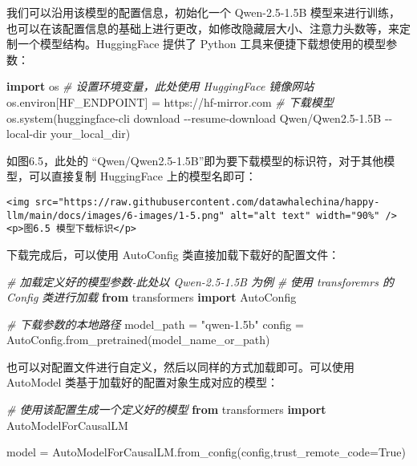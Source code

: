 \documentclass[
]{article}
\newenvironment{Shaded}{}{}
\newcommand{\CommentTok}[1]{\textcolor[rgb]{0.38,0.63,0.69}{\textit{#1}}}
\newcommand{\ImportTok}[1]{\textcolor[rgb]{0.00,0.50,0.00}{\textbf{#1}}}
\newcommand{\NormalTok}[1]{#1}
\newcommand{\OperatorTok}[1]{\textcolor[rgb]{0.40,0.40,0.40}{#1}}
\newcommand{\StringTok}[1]{\textcolor[rgb]{0.25,0.44,0.63}{#1}}
\newcommand{\VariableTok}[1]{\textcolor[rgb]{0.10,0.09,0.49}{#1}}
\begin{document}
我们可以沿用该模型的配置信息，初始化一个 Qwen-2.5-1.5B
模型来进行训练，也可以在该配置信息的基础上进行更改，如修改隐藏层大小、注意力头数等，来定制一个模型结构。HuggingFace
提供了 Python 工具来便捷下载想使用的模型参数：

\begin{Shaded}
\begin{Highlighting}[]
\ImportTok{import}\NormalTok{ os}
\CommentTok{\# 设置环境变量，此处使用 HuggingFace 镜像网站}
\NormalTok{os.environ[}\StringTok{\textquotesingle{}HF\_ENDPOINT\textquotesingle{}}\NormalTok{] }\OperatorTok{=} \StringTok{\textquotesingle{}https://hf{-}mirror.com\textquotesingle{}}
\CommentTok{\# 下载模型}
\NormalTok{os.system(}\StringTok{\textquotesingle{}huggingface{-}cli download {-}{-}resume{-}download Qwen/Qwen2.5{-}1.5B {-}{-}local{-}dir your\_local\_dir\textquotesingle{}}\NormalTok{)}
\end{Highlighting}
\end{Shaded}

如图6.5，此处的
``Qwen/Qwen2.5-1.5B''即为要下载模型的标识符，对于其他模型，可以直接复制
HuggingFace 上的模型名即可：

\begin{verbatim}
<img src="https://raw.githubusercontent.com/datawhalechina/happy-llm/main/docs/images/6-images/1-5.png" alt="alt text" width="90%" />
<p>图6.5 模型下载标识</p>
\end{verbatim}

下载完成后，可以使用 AutoConfig 类直接加载下载好的配置文件：

\begin{Shaded}
\begin{Highlighting}[]
\CommentTok{\# 加载定义好的模型参数{-}此处以 Qwen{-}2.5{-}1.5B 为例}
\CommentTok{\# 使用 transforemrs 的 Config 类进行加载}
\ImportTok{from}\NormalTok{ transformers }\ImportTok{import}\NormalTok{ AutoConfig}

\CommentTok{\# 下载参数的本地路径}
\NormalTok{model\_path }\OperatorTok{=} \StringTok{"qwen{-}1.5b"}
\NormalTok{config }\OperatorTok{=}\NormalTok{ AutoConfig.from\_pretrained(model\_name\_or\_path)}
\end{Highlighting}
\end{Shaded}

也可以对配置文件进行自定义，然后以同样的方式加载即可。可以使用 AutoModel
类基于加载好的配置对象生成对应的模型：

\begin{Shaded}
\begin{Highlighting}[]
\CommentTok{\# 使用该配置生成一个定义好的模型}
\ImportTok{from}\NormalTok{ transformers }\ImportTok{import}\NormalTok{ AutoModelForCausalLM}

\NormalTok{model }\OperatorTok{=}\NormalTok{ AutoModelForCausalLM.from\_config(config,trust\_remote\_code}\OperatorTok{=}\VariableTok{True}\NormalTok{)}
\end{Highlighting}
\end{Shaded}
\end{document}
